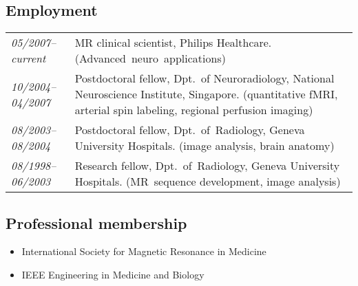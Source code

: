 \documentclass[a4paper,11pt,oneside]{article}
\begin{document}
\vspace{5mm}

\subsection*{Employment}
\begin{tabular}{>{\itshape}p{3cm} p{12cm}}

05/2007--current & MR clinical scientist, Philips Healthcare. 
        (Advanced~neuro~applications)\\ 

10/2004--04/2007 & Postdoctoral fellow, Dpt.\ of Neuroradiology,
           National Neuroscience Institute, Singapore. %
           (quantitative fMRI, arterial spin labeling, 
           regional \mbox{perfusion} imaging)\\

08/2003--08/2004 & Postdoctoral fellow, Dpt.\ of~Radiology,
            Geneva University \mbox{Hospitals}. %
            (image analysis, brain anatomy)\\


08/1998--06/2003  & Research fellow, Dpt.~of~Radiology, Geneva
University Hospitals. (MR~sequence development, image analysis)\\
\end{tabular}

\vspace{5mm}

\subsection*{Professional membership}
\begin{itemize}
\item International Society for Magnetic Resonance in Medicine 
\item IEEE Engineering in Medicine and Biology
\end{itemize}

\pagebreak
\end{document}
